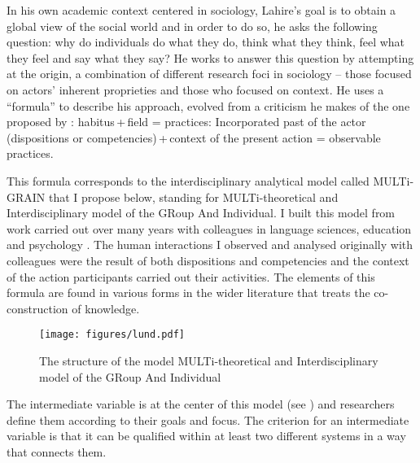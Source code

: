 \documentclass[output=paper]{langscibook}
\begin{document}
In his own academic context centered in sociology, Lahire’s goal is to obtain a global view of the social world and in order to do so, he asks the following question: why do individuals do what they do, think what they think, feel what they feel and say what they say? He works to answer this question by attempting at the origin, a combination of different research foci in sociology – those focused on actors’ inherent proprieties and those who focused on context. He uses a “formula” to describe his approach, evolved from a criticism he makes of the one proposed by \citet{Bourdieu1979}: habitus\,+\,field = practices: Incorporated past of the actor (dispositions or competencies)\,+\,context of the present action = observable practices.

\begin{sloppypar}
This formula corresponds to the interdisciplinary analytical model called MULTi-GRAIN that I propose below, standing for MULTi-theoretical and Interdisciplinary model of the GRoup And Individual. I built this model from work carried out over many years with colleagues in language sciences, education and psychology \citep{Lund2016}. The human interactions I observed and analysed originally with colleagues were the result of both dispositions and competencies and the context of the action participants carried out their activities. The elements of this formula are found in various forms in the wider literature that treats the co-construction of knowledge.
\end{sloppypar}

\begin{figure}
\texttt{[image: figures/lund.pdf]}
\caption{The structure of the model MULTi-theoretical and Interdisciplinary model of the GRoup And Individual\label{fig:4:2}}
\end{figure}


The intermediate variable is at the center of this model (see ) and researchers define them according to their goals and focus. The criterion for an intermediate variable is that it can be qualified within at least two different systems in a way that connects them.
\end{document}
